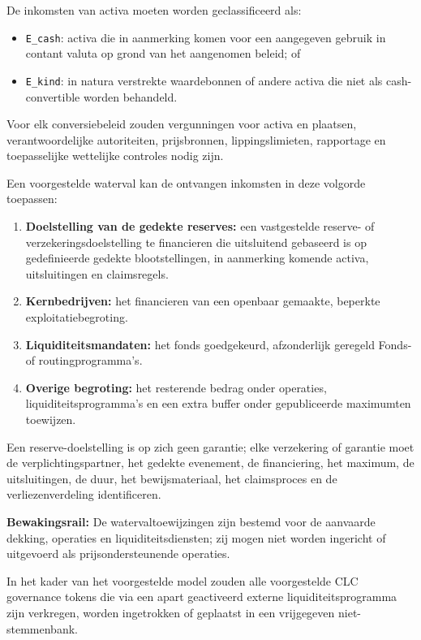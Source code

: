 \documentclass[11pt]{article}
\begin{document}
De inkomsten van activa moeten worden geclassificeerd als:

\begin{itemize}[leftmargin=*]
\item \texttt{E\_cash}: activa die in aanmerking komen voor een aangegeven gebruik in contant valuta op grond van het aangenomen beleid; of
\item \texttt{E\_kind}: in natura verstrekte waardebonnen of andere activa die niet als cash-convertible worden behandeld.
\end{itemize}
Voor elk conversiebeleid zouden vergunningen voor activa en plaatsen, verantwoordelijke autoriteiten, prijsbronnen, lippingslimieten, rapportage en toepasselijke wettelijke controles nodig zijn.

Een voorgestelde waterval kan de ontvangen inkomsten in deze volgorde toepassen:

\begin{enumerate}[leftmargin=*]
\item \textbf{Doelstelling van de gedekte reserves:} een vastgestelde reserve- of verzekeringsdoelstelling te financieren die uitsluitend gebaseerd is op gedefinieerde gedekte blootstellingen, in aanmerking komende activa, uitsluitingen en claimsregels.
\item \textbf{Kernbedrijven:} het financieren van een openbaar gemaakte, beperkte exploitatiebegroting.
\item \textbf{Liquiditeitsmandaten:} het fonds goedgekeurd, afzonderlijk geregeld Fonds- of routingprogramma's.
\item \textbf{Overige begroting:} het resterende bedrag onder operaties, liquiditeitsprogramma's en een extra buffer onder gepubliceerde maximumten toewijzen.
\end{enumerate}
Een reserve-doelstelling is op zich geen garantie; elke verzekering of garantie moet de verplichtingspartner, het gedekte evenement, de financiering, het maximum, de uitsluitingen, de duur, het bewijsmateriaal, het claimsproces en de verliezenverdeling identificeren.

\textbf{Bewakingsrail:} De watervaltoewijzingen zijn bestemd voor de aanvaarde dekking, operaties en liquiditeitsdiensten; zij mogen niet worden ingericht of uitgevoerd als prijsondersteunende operaties.

In het kader van het voorgestelde model zouden alle voorgestelde CLC governance tokens die via een apart geactiveerd externe liquiditeitsprogramma zijn verkregen, worden ingetrokken of geplaatst in een vrijgegeven niet-stemmenbank.
\end{document}

